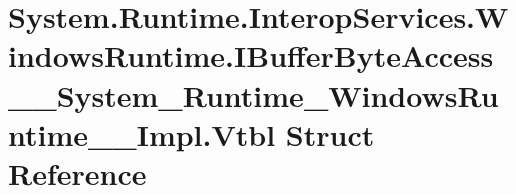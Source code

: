 \hypertarget{struct_system_1_1_runtime_1_1_interop_services_1_1_windows_runtime_1_1_i_buffer_byte_access_____6d4d383a825dd9054acf9d9a911f036f}{}\section{System.\+Runtime.\+Interop\+Services.\+Windows\+Runtime.\+I\+Buffer\+Byte\+Access\+\_\+\+\_\+\+System\+\_\+\+Runtime\+\_\+\+Windows\+Runtime\+\_\+\+\_\+\+Impl.\+Vtbl Struct Reference}
\label{struct_system_1_1_runtime_1_1_interop_services_1_1_windows_runtime_1_1_i_buffer_byte_access_____6d4d383a825dd9054acf9d9a911f036f}
